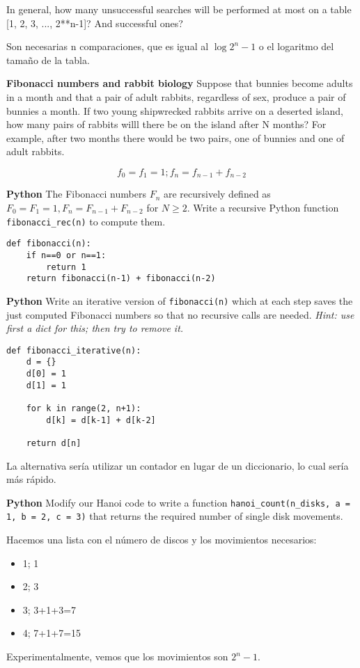 \documentclass[nochap]{config/ejercicios}
\begin{document}
\begin{problemS}
In general, how many unsuccessful searches will be performed at most on a table [1, 2, 3, ..., 2**n-1]? And successful ones?

Son necesarias n comparaciones, que es igual al $\log 2^n - 1$ o el logaritmo del tamaño de la tabla.
\end{problemS}

\begin{problemS} \textbf{Fibonacci numbers and rabbit biology}
Suppose that bunnies become adults in a month and that a pair of adult rabbits, regardless of sex, produce a pair of bunnies a month. If two young shipwrecked rabbits arrive on a deserted island, how many pairs of rabbits willl there be on the island after N months? For example, after two months there would be two pairs, one of bunnies and one of adult rabbits. 

$$f_0 = f_1 = 1; f_n = f_{n-1} + f_{n-2}$$
\end{problemS}

\begin{problemS} \textbf{Python}
The Fibonacci numbers $F_n$ are recursively defined as $F_0 = F_1 = 1, F_n = F_{n-1} + F_{n-2}$ for $N \geq 2$. Write a recursive Python function \texttt{fibonacci\_rec(n)} to compute them.

\begin{lstlisting}
def fibonacci(n):
	if n==0 or n==1:
		return 1
	return fibonacci(n-1) + fibonacci(n-2)
\end{lstlisting}
\end{problemS}

\begin{problemS} \textbf{Python}
Write an iterative version of \texttt{fibonacci(n)} which at each step saves the just computed Fibonacci numbers so that no recursive calls are needed. \textit{Hint: use first a dict for this; then try to remove it.}

\begin{lstlisting}
def fibonacci_iterative(n):
	d = {}
	d[0] = 1
	d[1] = 1
	
	for k in range(2, n+1):
		d[k] = d[k-1] + d[k-2]
		
	return d[n]
\end{lstlisting}

La alternativa sería utilizar un contador en lugar de un diccionario, lo cual sería más rápido.
\end{problemS}

\begin{problemS} \textbf{Python}
Modify our Hanoi code to write a function \texttt{hanoi\_count(n\_disks, a = 1, b = 2, c = 3)} that returns the required number of single disk movements.

Hacemos una lista con el número de discos y los movimientos necesarios:
\begin{itemize}
\item 1; 1
\item 2; 3
\item 3; 3+1+3=7
\item 4; 7+1+7=15
\end{itemize}
Experimentalmente, vemos que los movimientos son $2^n-1$.
\end{problemS}
\end{document}
